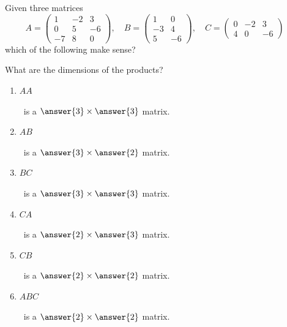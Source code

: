 \documentclass{ximera}
\begin{document}
\begin{question}
  Given three matrices
  \[
  A =\begin{pmatrix}
1 & -2 & 3 \\
0 & 5 & -6 \\
-7 & 8 & 0
\end{pmatrix},\quad B =\begin{pmatrix}
1 & 0 \\
-3 & 4 \\
5 & -6
\end{pmatrix}, \quad C =\begin{pmatrix}
0 & -2 & 3 \\
4 & 0 & -6
\end{pmatrix}\quad
  \]
  which of the following make sense?
  \begin{selectAll}
    \pdfOnly{\end{multicols}}
  \end{selectAll}
  \begin{question}
    What are the dimensions of the products?
    \begin{enumerate}
    \item $AA$\begin{prompt}~is a $\answer{3}\times\answer{3}$ matrix.\end{prompt}
    \item $AB$\begin{prompt}~is a $\answer{3}\times\answer{2}$ matrix.\end{prompt}
    \item $BC$\begin{prompt}~is a $\answer{3}\times\answer{3}$ matrix.\end{prompt}
    \item $CA$\begin{prompt}~is a $\answer{2}\times\answer{3}$ matrix.\end{prompt}
    \item $CB$\begin{prompt}~is a $\answer{2}\times\answer{2}$ matrix.\end{prompt}
    \item $ABC$\begin{prompt}~is a $\answer{2}\times\answer{2}$ matrix.\end{prompt}
    \end{enumerate}
    \pdfOnly{\end{multicols}}
  \end{question}
\end{question}
\end{document}

